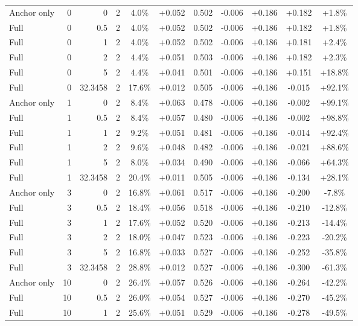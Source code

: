 \begin{table}[htbp]
\begin{tabular}{lrrrccccccc}
Anchor only & 0 & 0 & 2 & 4.0\% & +0.052 & 0.502 & -0.006 & +0.186 & +0.182 & +1.8\% \\
Full & 0 & 0.5 & 2 & 4.0\% & +0.052 & 0.502 & -0.006 & +0.186 & +0.182 & +1.8\% \\
Full & 0 & 1 & 2 & 4.0\% & +0.052 & 0.502 & -0.006 & +0.186 & +0.181 & +2.4\% \\
Full & 0 & 2 & 2 & 4.4\% & +0.051 & 0.503 & -0.006 & +0.186 & +0.182 & +2.3\% \\
Full & 0 & 5 & 2 & 4.4\% & +0.041 & 0.501 & -0.006 & +0.186 & +0.151 & +18.8\% \\
Full & 0 & 32.3458 & 2 & 17.6\% & +0.012 & 0.505 & -0.006 & +0.186 & -0.015 & +92.1\% \\
Anchor only & 1 & 0 & 2 & 8.4\% & +0.063 & 0.478 & -0.006 & +0.186 & -0.002 & +99.1\% \\
Full & 1 & 0.5 & 2 & 8.4\% & +0.057 & 0.480 & -0.006 & +0.186 & -0.002 & +98.8\% \\
Full & 1 & 1 & 2 & 9.2\% & +0.051 & 0.481 & -0.006 & +0.186 & -0.014 & +92.4\% \\
Full & 1 & 2 & 2 & 9.6\% & +0.048 & 0.482 & -0.006 & +0.186 & -0.021 & +88.6\% \\
Full & 1 & 5 & 2 & 8.0\% & +0.034 & 0.490 & -0.006 & +0.186 & -0.066 & +64.3\% \\
Full & 1 & 32.3458 & 2 & 20.4\% & +0.011 & 0.505 & -0.006 & +0.186 & -0.134 & +28.1\% \\
Anchor only & 3 & 0 & 2 & 16.8\% & +0.061 & 0.517 & -0.006 & +0.186 & -0.200 & -7.8\% \\
Full & 3 & 0.5 & 2 & 18.4\% & +0.056 & 0.518 & -0.006 & +0.186 & -0.210 & -12.8\% \\
Full & 3 & 1 & 2 & 17.6\% & +0.052 & 0.520 & -0.006 & +0.186 & -0.213 & -14.4\% \\
Full & 3 & 2 & 2 & 18.0\% & +0.047 & 0.523 & -0.006 & +0.186 & -0.223 & -20.2\% \\
Full & 3 & 5 & 2 & 16.8\% & +0.033 & 0.527 & -0.006 & +0.186 & -0.252 & -35.8\% \\
Full & 3 & 32.3458 & 2 & 28.8\% & +0.012 & 0.527 & -0.006 & +0.186 & -0.300 & -61.3\% \\
Anchor only & 10 & 0 & 2 & 26.4\% & +0.057 & 0.526 & -0.006 & +0.186 & -0.264 & -42.2\% \\
Full & 10 & 0.5 & 2 & 26.0\% & +0.054 & 0.527 & -0.006 & +0.186 & -0.270 & -45.2\% \\
Full & 10 & 1 & 2 & 25.6\% & +0.051 & 0.529 & -0.006 & +0.186 & -0.278 & -49.5\% \\

\end{tabular}
\end{table}
